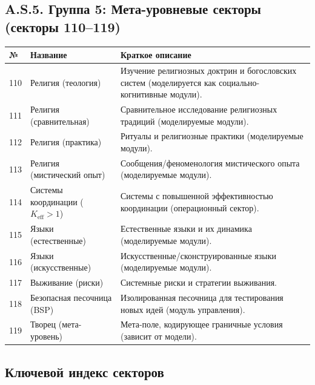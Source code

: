 \documentclass[11pt,a4paper]{article}
\newcommand{\Keff}{K_{\mathrm{eff}}}
\begin{document}
	\subsection*{A.S.5. Группа 5: Мета-уровневые секторы (секторы 110--119)}
	
	\begin{longtable}{|p{0.9cm}|p{6.0cm}|p{8.6cm}|}
		\hline
		\textbf{№} & \textbf{Название} & \textbf{Краткое описание} \\
		\hline
		\endhead
		110 & Религия (теология) & Изучение религиозных доктрин и богословских систем (моделируется как социально-когнитивные модули). \\
		111 & Религия (сравнительная) & Сравнительное исследование религиозных традиций (моделируемые модули). \\
		112 & Религия (практика) & Ритуалы и религиозные практики (моделируемые модули). \\
		113 & Религия (мистический опыт) & Сообщения/феноменология мистического опыта (моделируемые модули). \\
		114 & Системы координации ($\Keff>1$) & Системы с повышенной эффективностью координации (операционный сектор). \\
		115 & Языки (естественные) & Естественные языки и их динамика (моделируемые модули). \\
		116 & Языки (искусственные) & Искусственные/сконструированные языки (моделируемые модули). \\
		117 & Выживание (риски) & Системные риски и стратегии выживания. \\
		118 & Безопасная песочница (BSP) & Изолированная песочница для тестирования новых идей (модуль управления). \\
		119 & Творец (мета-уровень) & Мета-поле, кодирующее граничные условия (зависит от модели). \\
	\end{longtable}
	
	\subsection*{Ключевой индекс секторов}
	
\end{document}
